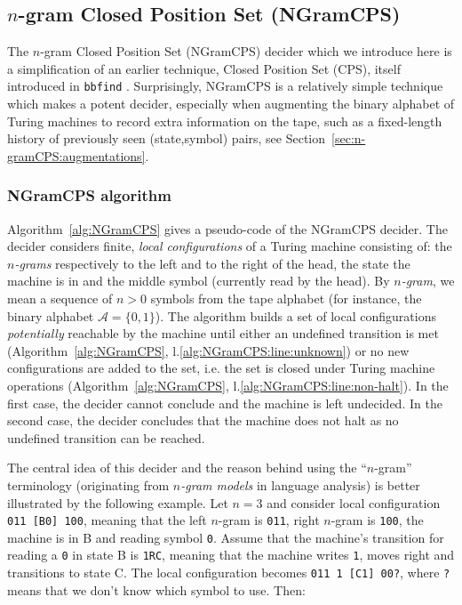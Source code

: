 
\newpage

\newcommand{\alphabet}{\mathcal{A}}
\newcommand{\ngramcps}{NGramCPS\xspace}

\subsection{$n$-gram Closed Position Set (\ngramcps)}\label{sec:n-gramCPS}

The $n$-gram Closed Position Set (\ngramcps) decider which we introduce here is a simplification of an earlier technique, Closed Position Set (CPS), itself introduced in \texttt{bbfind} \cite{Skelet_bbfind}. Surprisingly, \ngramcps is a relatively simple technique which makes a potent decider, especially when augmenting the binary alphabet of Turing machines to record extra information on the tape, such as a fixed-length history of previously seen (state,symbol) pairs, see Section~\ref{sec:n-gramCPS:augmentations}.

\subsubsection{\ngramcps algorithm}\label{sec:n-gramCPS:algo}

Algorithm~\ref{alg:NGramCPS} gives a pseudo-code of the \ngramcps decider. The decider considers finite, \textit{local configurations} of a Turing machine consisting of: the \textit{$n$-grams} respectively to the left and to the right of the head, the state the machine is in and the middle symbol (currently read by the head). By \textit{$n$-gram}, we mean a sequence of $n > 0$ symbols from the tape alphabet (for instance, the binary alphabet $\alphabet=\{0,1\}$). The algorithm builds a set of local configurations \textit{potentially} reachable by the machine until either an undefined transition is met (Algorithm~\ref{alg:NGramCPS}, l.\ref{alg:NGramCPS:line:unknown}) or no new configurations are added to the set, i.e. the set is closed under Turing machine operations (Algorithm~\ref{alg:NGramCPS}, l.\ref{alg:NGramCPS:line:non-halt}). In the first case, the decider cannot conclude and the machine is left undecided. In the second case, the decider concludes that the machine does not halt as no undefined transition can be reached.

The central idea of this decider and the reason behind using the ``$n$-gram'' terminology (originating from \textit{$n$-gram models} in language analysis)  is better illustrated by the following example. Let $n=3$ and consider local configuration \texttt{011 [B0] 100}, meaning that the left $n$-gram is \texttt{011}, right $n$-gram is \texttt{100}, the machine is in \textcolor{colorB}{B} and reading symbol \texttt{0}. Assume that the  machine's transition for reading a \texttt{0} in state \textcolor{colorB}{B} is \texttt{1RC}, meaning that the machine writes \texttt{1}, moves right and transitions to state \textcolor{colorC}{C}. The local configuration becomes \texttt{011 1 [C1] 00?}, where \texttt{?} means that we don't know which symbol to use. Then:


